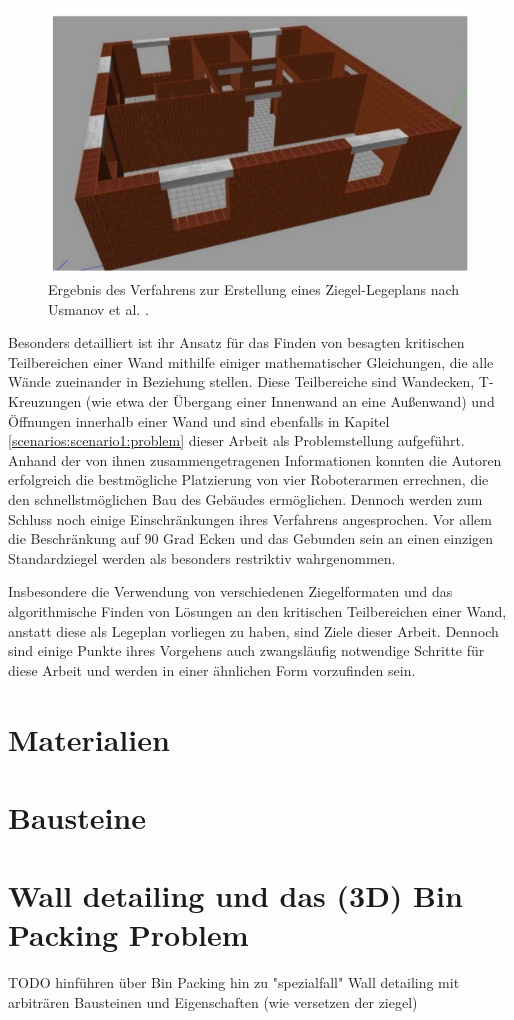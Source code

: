\begin{figure}[ht]
    \centering
    \includegraphics[width=0.6\columnwidth]{fig/sustainability-13-03905-g004.png}
    \caption{Ergebnis des Verfahrens zur Erstellung eines Ziegel-Legeplans nach Usmanov et al. \cite{Usmanov2021}.}
    \label{fig:usmanov}
\end{figure}

Besonders detailliert ist ihr Ansatz für das Finden von besagten kritischen Teilbereichen einer Wand mithilfe einiger mathematischer Gleichungen, die alle Wände zueinander in Beziehung stellen.
Diese Teilbereiche sind Wandecken, T-Kreuzungen (wie etwa der Übergang einer Innenwand an eine Außenwand) und Öffnungen innerhalb einer Wand und sind ebenfalls in Kapitel \ref{scenarios:scenario1:problem} dieser Arbeit als Problemstellung aufgeführt.
Anhand der von ihnen zusammengetragenen Informationen konnten die Autoren erfolgreich die bestmögliche Platzierung von vier Roboterarmen errechnen, die den schnellstmöglichen Bau des Gebäudes ermöglichen.
Dennoch werden zum Schluss noch einige Einschränkungen ihres Verfahrens angesprochen.
Vor allem die Beschränkung auf 90 Grad Ecken und das Gebunden sein an einen einzigen Standardziegel werden als besonders restriktiv wahrgenommen.

Insbesondere die Verwendung von verschiedenen Ziegelformaten und das algorithmische Finden von Lösungen an den kritischen Teilbereichen einer Wand, anstatt diese als Legeplan vorliegen zu haben, sind Ziele dieser Arbeit.
Dennoch sind einige Punkte ihres Vorgehens auch zwangsläufig notwendige Schritte für diese Arbeit und werden in einer ähnlichen Form vorzufinden sein.

\section{Materialien}
\section{Bausteine}
\section{Wall detailing und das (3D) Bin Packing Problem}
\label{basics:wall-detailing}
TODO hinführen über Bin Packing hin zu "spezialfall" Wall detailing mit arbiträren Bausteinen und Eigenschaften (wie versetzen der ziegel)

